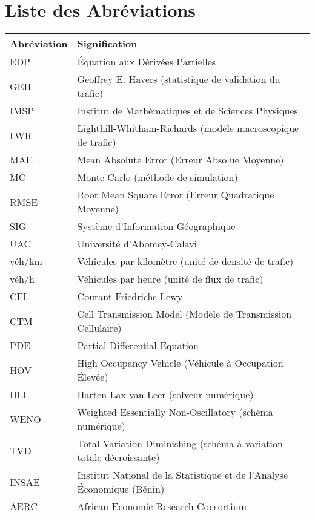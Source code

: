 \chapter*{Liste des Abréviations}
\thispagestyle{fancy}

\begin{tabular}{ll}
\toprule
\textbf{Abréviation} & \textbf{Signification} \\
\midrule
EDP & Équation aux Dérivées Partielles \\
GEH & Geoffrey E. Havers (statistique de validation du trafic) \\
IMSP & Institut de Mathématiques et de Sciences Physiques \\
LWR & Lighthill-Whitham-Richards (modèle macroscopique de trafic) \\
MAE & Mean Absolute Error (Erreur Absolue Moyenne) \\
MC & Monte Carlo (méthode de simulation) \\
RMSE & Root Mean Square Error (Erreur Quadratique Moyenne) \\
SIG & Système d'Information Géographique \\
UAC & Université d'Abomey-Calavi \\
véh/km & Véhicules par kilomètre (unité de densité de trafic) \\
véh/h & Véhicules par heure (unité de flux de trafic) \\
CFL & Courant-Friedrichs-Lewy \\
CTM & Cell Transmission Model (Modèle de Transmission Cellulaire) \\
PDE & Partial Differential Equation \\
HOV & High Occupancy Vehicle (Véhicule à Occupation Élevée) \\
HLL & Harten-Lax-van Leer (solveur numérique) \\
WENO & Weighted Essentially Non-Oscillatory (schéma numérique) \\
TVD & Total Variation Diminishing (schéma à variation totale décroissante) \\
INSAE & Institut National de la Statistique et de l'Analyse Économique (Bénin) \\
AERC & African Economic Research Consortium \\
\bottomrule
\end{tabular}

\vspace{1cm}


